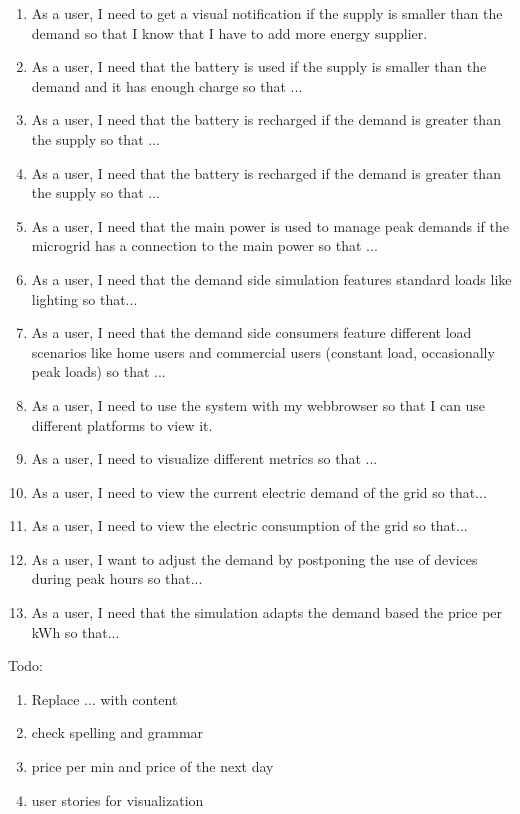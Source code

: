 \begin{enumerate}
\item As a user, I need to get a visual notification if the supply is smaller than the demand so that I know that I have to add more energy supplier.

\item As a user, I need that the battery is used if the supply is smaller than the demand and it has enough charge so that ...

\item As a user, I need that the battery is recharged if the demand is greater than the supply so that ...

\item As a user, I need that the battery is recharged if the demand is greater than the supply so that ...

\item As a user, I need that the main power is used to manage peak demands if the microgrid has a connection to the main power so that ...

\item As a user, I need that the demand side simulation features standard loads like lighting so that...

\item As a user, I need that the demand side consumers feature different load scenarios like home users and commercial users (constant load, occasionally peak loads) so that ...

\item As a user, I need to use the system with my webbrowser so that I can use different platforms to view it.

\item As a user, I need to visualize different metrics so that ...

\item As a user, I need to view the current electric demand of the grid so that...

\item As a user, I need to view the electric consumption of the grid so that...

\item As a user, I want to adjust the demand by postponing the use of devices during peak hours so that...

\item As a user, I need that the simulation adapts the demand based the price per kWh so that...



\end{enumerate}
Todo:\\
\begin{enumerate}
	\item Replace ... with content
	\item check spelling and grammar
	\item price per min and price of the next day
	\item user stories for visualization
\end{enumerate}


